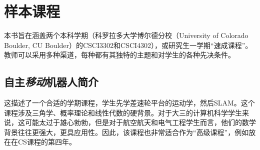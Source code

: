 

\chapter{样本课程}

本书旨在涵盖两个本科学期（科罗拉多大学博尔德分校（University of Colorado Boulder, CU Boulder）的CSCI3302和CSCI4302），或研究生一学期“速成课程”。教师可以采用多种渠道，每种都有其独特的主题和对学生的各种先决条件。
 

\section{自主\emph{移动}机器人简介}
这描述了一个合适的学期课程，学生先学差速轮平台的运动学，然后SLAM。这个课程涉及三角学、概率理论和线性代数的硬背景。对于大三的计算机科学学生来说，这可能太过于雄心勃勃，但是对于航空航天和电气工程学生而言，他们的数学背景往往更强大，更具应用性。因此，该课程也非常适合作为“高级课程”，例如放在在CS课程的第四年。


